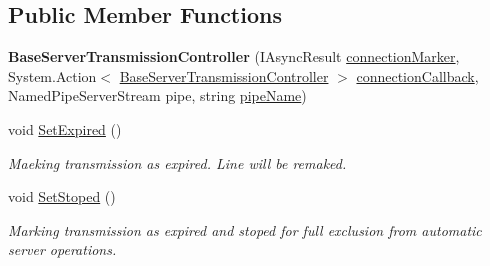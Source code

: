 \subsection*{Public Member Functions}
\begin{DoxyCompactItemize}
\item 
\mbox{\label{class_pipes_provider_1_1_server_1_1_transmission_controllers_1_1_base_server_transmission_controller_ad3ffb9dd45062b59d88dd08f9df90c5f}} 
{\bfseries Base\+Server\+Transmission\+Controller} (I\+Async\+Result \mbox{\hyperlink{class_pipes_provider_1_1_server_1_1_transmission_controllers_1_1_base_server_transmission_controller_afc45a2287e6fef24892a0aee8aa86f56}{connection\+Marker}}, System.\+Action$<$ \mbox{\hyperlink{class_pipes_provider_1_1_server_1_1_transmission_controllers_1_1_base_server_transmission_controller}{Base\+Server\+Transmission\+Controller}} $>$ \mbox{\hyperlink{class_pipes_provider_1_1_server_1_1_transmission_controllers_1_1_base_server_transmission_controller_a632261255d8dfc87d93445180c6e2c9d}{connection\+Callback}}, Named\+Pipe\+Server\+Stream pipe, string \mbox{\hyperlink{class_pipes_provider_1_1_server_1_1_transmission_controllers_1_1_base_server_transmission_controller_a4ce9911f1ad6814d3e5c9096d9ddde57}{pipe\+Name}})
\item 
void \mbox{\hyperlink{class_pipes_provider_1_1_server_1_1_transmission_controllers_1_1_base_server_transmission_controller_a6123ecf83e5ed7d39e8fe457681e3bfc}{Set\+Expired}} ()
\begin{DoxyCompactList}\small\item\em Maeking transmission as expired. Line will be remaked. \end{DoxyCompactList}\item 
void \mbox{\hyperlink{class_pipes_provider_1_1_server_1_1_transmission_controllers_1_1_base_server_transmission_controller_a838c1d62567059bbe92e9be3eca971d5}{Set\+Stoped}} ()
\begin{DoxyCompactList}\small\item\em Marking transmission as expired and stoped for full exclusion from automatic server operations. \end{DoxyCompactList}\end{DoxyCompactItemize}
